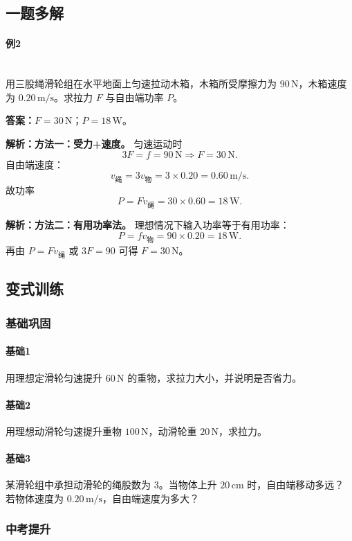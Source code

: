 \documentclass[12pt,a4paper]{ctexart}
\newcommand{\Ans}[1]{\par\noindent\textbf{答案：}#1\par}
\newcommand{\Sol}[1]{\par\noindent\textbf{解析：}#1\par}
\begin{document}
\subsection{一题多解}
\paragraph{例2}\mbox{}
\\
用三股绳滑轮组在水平地面上匀速拉动木箱，木箱所受摩擦力为 $90\,\mathrm{N}$，木箱速度为
$0.20\,\mathrm{m/s}$。求拉力 $F$ 与自由端功率 $P$。

\Ans{$F=30\,\mathrm{N}$；$P=18\,\mathrm{W}$。}

\Sol{\textbf{方法一：受力+速度。}
匀速运动时
\[
3F=f=90\,\mathrm{N}\Rightarrow F=30\,\mathrm{N}.
\]
自由端速度：
\[
v_{\text{绳}}=3v_{\text{物}}=3\times 0.20=0.60\,\mathrm{m/s}.
\]
故功率
\[
P=Fv_{\text{绳}}=30\times 0.60=18\,\mathrm{W}.
\]}

\Sol{\textbf{方法二：有用功率法。}
理想情况下输入功率等于有用功率：
\[
P=fv_{\text{物}}=90\times 0.20=18\,\mathrm{W}.
\]
再由 $P=Fv_{\text{绳}}$ 或 $3F=90$ 可得 $F=30\,\mathrm{N}$。}

\subsection{变式训练}

\subsubsection*{基础巩固}
\paragraph{基础1}
用理想定滑轮匀速提升 $60\,\mathrm{N}$ 的重物，求拉力大小，并说明是否省力。

\paragraph{基础2}
用理想动滑轮匀速提升重物 $100\,\mathrm{N}$，动滑轮重 $20\,\mathrm{N}$，求拉力。

\paragraph{基础3}
某滑轮组中承担动滑轮的绳股数为 3。当物体上升 $20\,\mathrm{cm}$ 时，自由端移动多远？
若物体速度为 $0.20\,\mathrm{m/s}$，自由端速度为多大？

\subsubsection*{中考提升}
\end{document}
